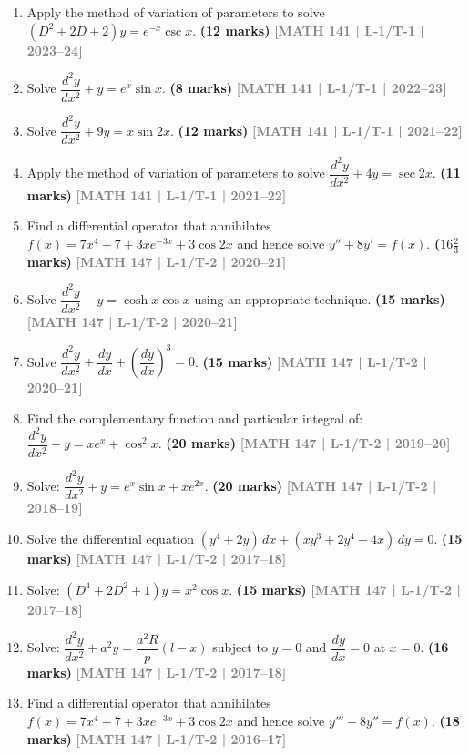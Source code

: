 \documentclass[12pt,a4paper]{article}
\newcommand{\yr}[1]{\hfill\textcolor{gray}{\small\textbf{[#1]}}}
\newcommand{\mk}[1]{\textcolor{orange!70!black}{\small\textbf{(#1 marks)}}}
\begin{document}
\begin{enumerate}\item Apply the method of variation of parameters to solve $(D^{2}+2D+2)y=e^{-x}\csc x$.
\mk{12} \yr{MATH 141 | L-1/T-1 | 2023--24}

\item Solve $\dfrac{d^{2}y}{dx^{2}}+y=e^{x}\sin x$.
\mk{8} \yr{MATH 141 | L-1/T-1 | 2022--23}

\item Solve $\dfrac{d^{2}y}{dx^{2}}+9y=x\sin 2x$.
\mk{12} \yr{MATH 141 | L-1/T-1 | 2021--22}

\item Apply the method of variation of parameters to solve $\dfrac{d^{2}y}{dx^{2}}+4y=\sec 2x$.
\mk{11} \yr{MATH 141 | L-1/T-1 | 2021--22}

\item Find a differential operator that annihilates $f(x)=7x^{4}+7+3xe^{-3x}+3\cos 2x$ and hence solve $y''+8y'=f(x)$.
\mk{$16\tfrac{2}{3}$} \yr{MATH 147 | L-1/T-2 | 2020--21}

\item Solve $\dfrac{d^{2}y}{dx^{2}}-y=\cosh x\cos x$ using an appropriate technique.
\mk{15} \yr{MATH 147 | L-1/T-2 | 2020--21}

\item Solve $\dfrac{d^{2}y}{dx^{2}}+\dfrac{dy}{dx}+\left(\dfrac{dy}{dx}\right)^{3}=0$.
\mk{15} \yr{MATH 147 | L-1/T-2 | 2020--21}

\item Find the complementary function and particular integral of: $\dfrac{d^{2}y}{dx^{2}}-y=xe^{x}+\cos^{2}x$.
\mk{20} \yr{MATH 147 | L-1/T-2 | 2019--20}

\item Solve: $\dfrac{d^{2}y}{dx^{2}}+y=e^{x}\sin x+xe^{2x}$.
\mk{20} \yr{MATH 147 | L-1/T-2 | 2018--19}

\item Solve the differential equation $(y^{4}+2y)\,dx+(xy^{3}+2y^{4}-4x)\,dy=0$.
\mk{15} \yr{MATH 147 | L-1/T-2 | 2017--18}

\item Solve: $(D^{4}+2D^{2}+1)y=x^{2}\cos x$.
\mk{15} \yr{MATH 147 | L-1/T-2 | 2017--18}

\item Solve: $\dfrac{d^{2}y}{dx^{2}}+a^{2}y=\dfrac{a^{2}R}{p}(l-x)$ subject to $y=0$ and $\dfrac{dy}{dx}=0$ at $x=0$.
\mk{16} \yr{MATH 147 | L-1/T-2 | 2017--18}

\item Find a differential operator that annihilates $f(x)=7x^{4}+7+3xe^{-3x}+3\cos 2x$ and hence solve $y'''+8y''=f(x)$.
\mk{18} \yr{MATH 147 | L-1/T-2 | 2016--17}


\end{enumerate}
\end{document}
